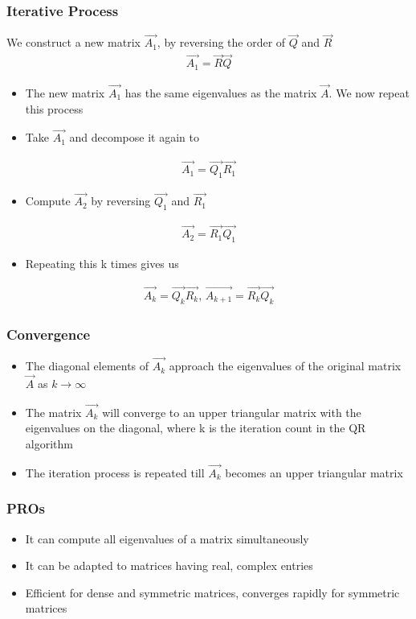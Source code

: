 \documentclass[journal]{IEEEtran}
\begin{document}
\subsubsection{Iterative Process}
We construct a new matrix $\vec{A_1}$, by reversing the order of $\vec{Q}$ and $\vec{R}$
\begin{align*}
    \vec{A_1}=\vec{R}\vec{Q}
\end{align*}
\begin{itemize}
    \item The new matrix $\vec{A_1}$ has the same eigenvalues as the matrix $\vec{A}$. We now repeat this process 
    \item Take $\vec{A_1}$ and decompose it again to 
\end{itemize}
\begin{align*}
    \vec{A_1}=\vec{Q_1}\vec{R_1}
\end{align*}
\begin{itemize}
    \item Compute $\vec{A_2}$ by reversing $\vec{Q_1}$ and $\vec{R_1}$
\end{itemize}
\begin{align*}
    \vec{A_2}=\vec{R_1}\vec{Q_1}
\end{align*}
\begin{itemize}
    \item Repeating this k times gives us 
\end{itemize}
\begin{align*}
    \vec{A_k}=\vec{Q_k}\vec{R_k} \text{,   } \vec{A_{k+1}}=\vec{R_k}\vec{Q_k}
\end{align*}
\subsubsection{Convergence}
\begin{itemize}
    \item The diagonal elements of $\vec{A_k}$ approach the eigenvalues of the original matrix $\vec{A}$ as $k\rightarrow \infty$
    \item The matrix $\vec{A_k}$ will converge to an upper triangular matrix with the eigenvalues on the diagonal, where k is the iteration count in the QR algorithm 
    \item The iteration process is repeated till $\vec{A_k}$ becomes an upper triangular matrix \\
\end{itemize}
\subsubsection{PROs}
\begin{itemize}
    \item It can compute all eigenvalues of a matrix simultaneously
    \item It can be adapted to matrices having real, complex entries 
    \item Efficient for dense and symmetric matrices, converges rapidly for symmetric matrices\\
\end{itemize}
\end{document}
